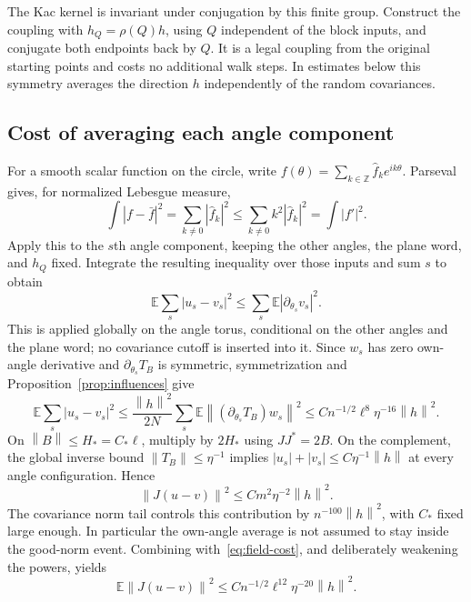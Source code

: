 \documentclass[11pt]{article}
\theoremstyle{definition}\newtheorem{definition}[theorem]{Definition}
\theoremstyle{remark}\newtheorem{remark}[theorem]{Remark}
\newcommand{\E}{\mathbb E}
\newcommand{\norm}[1]{\left\lVert#1\right\rVert}
\begin{document}
The Kac kernel is invariant under conjugation by this finite group. Construct the coupling with $h_Q=\rho(Q)h$, using $Q$ independent of the block inputs, and conjugate both endpoints back by $Q$. It is a legal coupling from the original starting points and costs no additional walk steps. In estimates below this symmetry averages the direction $h$ independently of the random covariances.

\subsection{Cost of averaging each angle component}

For a smooth scalar function on the circle, write
$f(\theta)=\sum_{k\in\mathbb Z}\widehat f_k e^{ik\theta}$. Parseval gives, for normalized Lebesgue measure,
\[
 \int|f-\bar f|^2=\sum_{k\ne0}|\widehat f_k|^2
 \le\sum_{k\ne0}k^2|\widehat f_k|^2=\int|f'|^2.
\]
Apply this to the $s$th angle component, keeping the other angles, the plane word, and $h_Q$ fixed. Integrate the resulting inequality over those inputs and sum $s$ to obtain
\begin{equation}\label{eq:circle-Poincare-full}
 \E\sum_s|u_s-v_s|^2\le\sum_s\E|\partial_{\theta_s}v_s|^2.
\end{equation}
This is applied globally on the angle torus, conditional on the other angles and the plane word; no covariance cutoff is inserted into it. Since $w_s$ has zero own-angle derivative and $\partial_{\theta_s}T_B$ is symmetric, symmetrization and Proposition~\ref{prop:influences} give
\begin{equation}\label{eq:field-cost}
 \E\sum_s|u_s-v_s|^2
 \le\frac{\norm h^2}{2N}
       \sum_s\E\norm{(\partial_{\theta_s}T_B)w_s}^2
 \le C n^{-1/2}\ell^8\eta^{-16}\norm h^2.
\end{equation}
On $\norm B\le H_*=C_*\ell$, multiply by $2H_*$ using $JJ^*=2B$.
On the complement, the global inverse bound $\norm{T_B}\le\eta^{-1}$ implies
$|u_s|+|v_s|\le C\eta^{-1}\norm h$ at every angle configuration. Hence
\[
 \norm{J(u-v)}^2\le Cm^2\eta^{-2}\norm h^2.
\]
The covariance norm tail controls this contribution by $n^{-100}\norm h^2$, with $C_*$ fixed large enough. In particular the own-angle average is not assumed to stay inside the good-norm event. Combining with~\eqref{eq:field-cost}, and deliberately weakening the powers, yields
\begin{equation}\label{eq:repair-final}
 \E\norm{J(u-v)}^2
 \le C n^{-1/2}\ell^{12}\eta^{-20}\norm h^2.
\end{equation}
\end{document}
